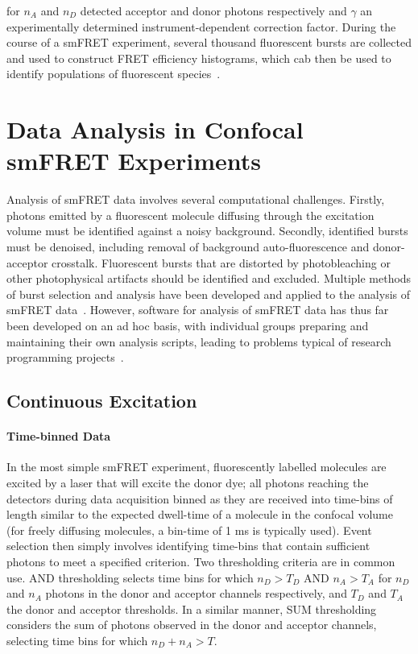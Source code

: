 for $n_A$ and $n_D$ detected acceptor and donor photons respectively and $\gamma$ an experimentally determined instrument-dependent correction factor. During the course of a smFRET experiment, several thousand fluorescent bursts are collected and used to construct FRET efficiency histograms, which cab then be used to identify populations of fluorescent species~\cite{ha96}.

\section{Data Analysis in Confocal smFRET Experiments}
Analysis of smFRET data involves several computational challenges. Firstly, photons emitted by a fluorescent molecule diffusing through the excitation volume must be identified against a noisy background. Secondly, identified bursts must be denoised, including removal of background auto-fluorescence and donor-acceptor crosstalk. Fluorescent bursts that are distorted by photobleaching or other photophysical artifacts should be identified and excluded. Multiple methods of burst selection and analysis have been developed and applied to the analysis of smFRET data~\cite{weiss00, deniz01, gell06, nir06, kapanidis05, muller05, doose07, kudryavtsev2012, eggeling01}. However, software for analysis of smFRET data has thus far been developed on an ad hoc basis, with individual groups preparing and maintaining their own analysis scripts, leading to problems typical of research programming projects~\cite{wilson06, merali10}. 

\subsection{Continuous Excitation}
\paragraph{Time-binned Data}
In the most simple smFRET experiment, fluorescently labelled molecules are excited by a laser that will excite the donor dye; all photons reaching the detectors during data acquisition binned as they are received into time-bins of length similar to the expected dwell-time of a molecule in the confocal volume (for freely diffusing molecules, a bin-time of 1 ms is typically used). Event selection then simply involves identifying time-bins that contain sufficient photons to meet a specified criterion. Two thresholding criteria are in common use. AND thresholding selects time bins for which $n_D > T_D$ AND $n_A > T_A$ for $n_D$ and $n_A$ photons in the donor and acceptor channels respectively, and $T_D$ and $T_A$ the donor and acceptor thresholds. In a similar manner, SUM thresholding considers the sum of photons observed in the donor and acceptor channels, selecting time bins for which $n_D + n_A > T$.

